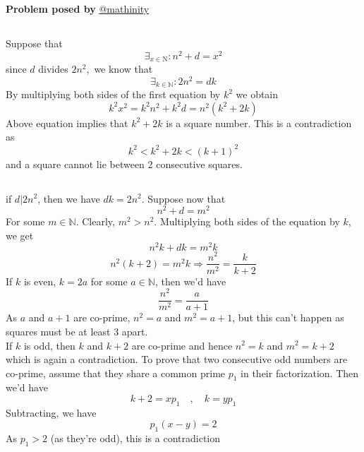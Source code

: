 \documentclass[12pt]{article}
\begin{document}
\begin{flushright}
\textbf{Problem posed by}
\textcolor{RoyalBlue2}{\href{https://www.instagram.com/mathinity/}{@mathinity}}
\end{flushright}



\subsection*{}

Suppose that
$$\exists_{x \in \mathrm{N}}: n^{2}+d=x^{2}$$
since $d$ divides $2 n^{2},$ we know that
$$\exists_{k \in \mathbb{N}}: 2 n^{2}=d k$$
By multiplying both sides of the first equation by $k^{2}$ we obtain
$$k^{2} x^{2}=k^{2} n^{2}+k^{2} d=n^{2}\left(k^{2}+2 k\right)$$
Above equation implies that $k^2+2k$ is a square number. This is a contradiction as $$k^2 < k^2+2k < (k+1)^2$$ and a square cannot lie between 2 consecutive squares.

\subsection*{}
if $d|2n^2$, then we have $dk = 2n^2$. Suppose now that 
$$ n^2+d = m^2 $$
For some $m \in \mathbb{N}$. Clearly, $m^2 > n^2$. Multiplying both sides of the equation by $k$, we get 
$$ n^2k+dk = m^2k $$
$$ n^2(k+2) = m^2k \Rightarrow \frac{n^2}{m^2} = \frac{k}{k+2} $$
If $k$ is even, $k = 2a$ for some $a \in \mathbb{N}$, then we'd have 
$$ \frac{n^2}{m^2} = \frac{a}{a+1} $$
As $a$ and $a+1$ are co-prime, $n^2 = a$ and $m^2 = a+1$, but this can't happen as squares must be at least 3 apart. \\ If $k$ is odd, then $k$ and $k+2$ are co-prime and hence $n^2 = k $ and $m^2 = k+2$ which is again a contradiction. To prove that two consecutive odd numbers are co-prime, assume that they share a common prime $p_1$ in their factorization. Then we'd have 
$$ k+2 = xp_1 \quad, \quad k = yp_1 $$
Subtracting, we have 
$$ p_1(x-y) = 2 $$
As $p_1 >  2 $ (as they're odd), this is a contradiction
\end{document}
